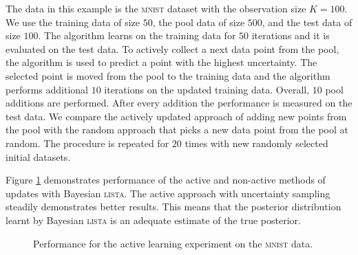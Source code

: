 \documentclass{article}
\begin{document}
  The data in this example is the \textsc{mnist} dataset with the observation size $K=100$. We use the training data of size $50$, the pool data of size $500$,  and the test data of size $100$. The algorithm learns on the training data for $50$ iterations and it is evaluated on the test data. To actively collect a next data point from the pool, the algorithm is used to predict a point with the highest uncertainty. The selected point is moved from the pool to the training data and the algorithm performs additional $10$ iterations on the updated training data. Overall, $10$ pool additions are performed. After every addition the performance is measured on the test data. We compare the actively updated approach of adding new points from the pool with the random approach that picks a new data point from the pool at random. The procedure is repeated for $20$ times with new randomly selected initial datasets.
  
  Figure \ref{fig:active_learning_mnist} demonstrates performance of the active and non-active methods of updates with Bayesian \textsc{lista}. The active approach with uncertainty sampling steadily demonstrates better results. This means that the posterior distribution learnt by Bayesian \textsc{lista} is an adequate estimate of the true posterior.
  \begin{figure}[t]
  \centering
  \caption{Performance for the active learning experiment on the \textsc{mnist} data. }
  \label{fig:active_learning_mnist}
  \end{figure}
  
\end{document}
